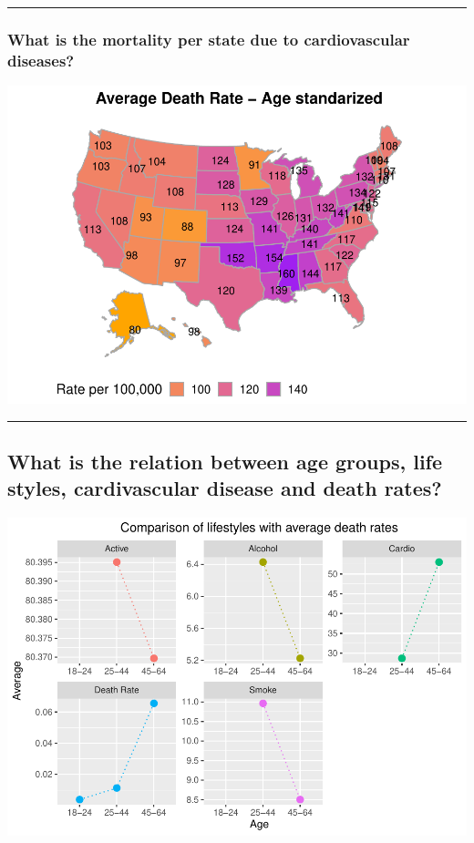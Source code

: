 \documentclass[]{article}
\begin{document}
\begin{center}\rule{0.5\linewidth}{\linethickness}\end{center}

\hypertarget{what-is-the-mortality-per-state-due-to-cardiovascular-diseases}{%
\subsubsection{What is the mortality per state due to cardiovascular
diseases?}\label{what-is-the-mortality-per-state-due-to-cardiovascular-diseases}}

\includegraphics{final_project_files/figure-latex/mapUSAvgDeathRate-1.pdf}

\begin{center}\rule{0.5\linewidth}{\linethickness}\end{center}

\hypertarget{what-is-the-relation-between-age-groups-life-styles-cardivascular-disease-and-death-rates}{%
\subsection{What is the relation between age groups, life styles,
cardivascular disease and death
rates?}\label{what-is-the-relation-between-age-groups-life-styles-cardivascular-disease-and-death-rates}}

\includegraphics{final_project_files/figure-latex/lifestyleJoinDeathRate-1.pdf}
\end{document}
